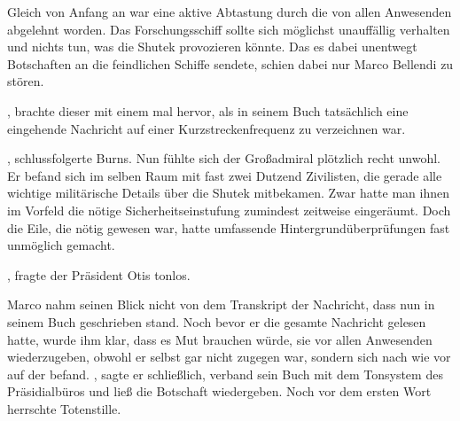 \par

Gleich von Anfang an war eine aktive Abtastung durch die  von allen Anwesenden abgelehnt worden. Das Forschungsschiff sollte sich möglichst unauffällig verhalten und nichts tun, was die Shutek provozieren könnte. Das es dabei unentwegt Botschaften an die feindlichen Schiffe sendete, schien dabei nur Marco Bellendi zu stören.

\par

, brachte dieser mit einem mal hervor, als in seinem Buch tatsächlich eine eingehende Nachricht auf einer Kurzstreckenfrequenz zu verzeichnen war. 

\par

, schlussfolgerte Burns.  Nun fühlte sich der Großadmiral plötzlich recht unwohl. Er befand sich im selben Raum mit fast zwei Dutzend Zivilisten, die gerade alle wichtige militärische Details über die Shutek mitbekamen. Zwar hatte man ihnen im Vorfeld die nötige Sicherheitseinstufung zumindest zeitweise eingeräumt. Doch die Eile, die nötig gewesen war, hatte umfassende Hintergrundüberprüfungen fast unmöglich gemacht.

\par

, fragte der Präsident Otis tonlos. 

\par

Marco nahm seinen Blick nicht von dem Transkript der Nachricht, dass nun in seinem Buch geschrieben stand. Noch bevor er die gesamte Nachricht gelesen hatte, wurde ihm klar, dass es Mut brauchen würde, sie vor allen Anwesenden wiederzugeben, obwohl er selbst gar nicht zugegen war, sondern sich nach wie vor auf der  befand. , sagte er schließlich, verband sein Buch mit dem Tonsystem des Präsidialbüros und ließ die Botschaft wiedergeben. Noch vor dem ersten Wort herrschte Totenstille.

\par

